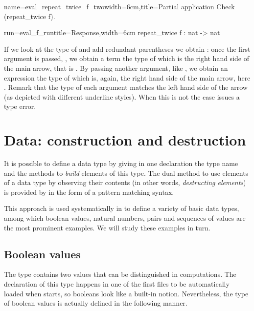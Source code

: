 \begin{coq}{name=eval_repeat_twice_f_two}{width=6cm,title=Partial application}
Check (repeat_twice f).
\end{coq}
\begin{coqout}{run=eval_f_run}{title=Response,width=6cm}
repeat_twice f : nat -> nat
\end{coqout}
If we look at the type of  and add redundant parentheses
we obtain :
once the first argument
is passed, , we obtain a term the type of which is
the right hand side of the main arrow, that is .
By passing another argument, like , we obtain an expression
the type of which is, again, the right hand side of the main arrow, here .
Remark that the type of each argument matches the left hand side of
the arrow (as depicted with different underline styles).
When this is not the case \Coq{} issues a type error.

\section{Data: construction and destruction}
It is possible to define a data type by giving in one declaration
the type name and the methods to \emph{build} elements of this type.
The dual method to use
elements of a data type by observing their contents (in other words, {\em destructing elements}) is provided by
\Coq{} in the form of a pattern matching syntax.

This approach is used
systematically in \Coq{} to define a variety of basic data types, among
which boolean values, natural numbers, pairs and sequences of values
are the most prominent examples.  We will study these examples in
turn.

\subsection{Boolean values}
The type  contains two values that can be
distinguished in computations.  The declaration of this type happens
in one of the first files to be automatically loaded when \Coq{} starts,
so booleans look like a built-in notion.  Nevertheless, the type of
boolean values is actually defined in the following manner.


